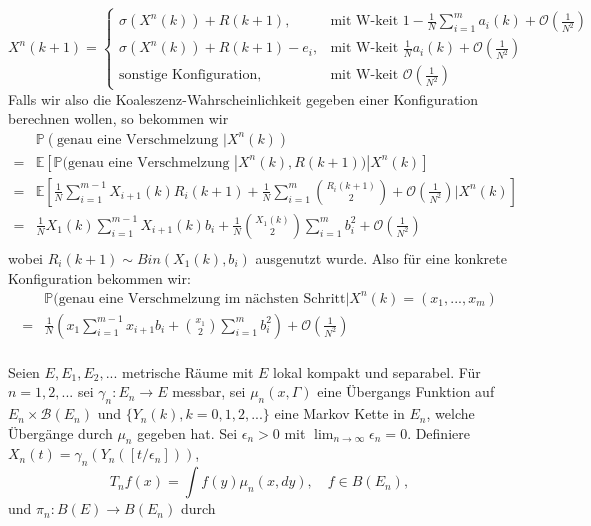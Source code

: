 \begin{equation}
    X^n(k+1) = 
    \begin{cases}
        \sigma(X^n(k)) + R(k+1), &\text{mit W-keit } 1 - \frac{1}{N}\sum_{i=1}^{m} a_i(k) + \mathcal{O}\left(\frac{1}{N^2}\right)\\
        \sigma(X^n(k)) + R(k+1) - e_i, &\text{mit W-keit } \frac{1}{N}a_i(k) + \mathcal{O}\left(\frac{1}{N^2}\right)\\
        \text{sonstige Konfiguration} , &\text{mit W-keit } \mathcal{O} \left(\frac{1}{N^2}\right) 
    \end{cases}
\end{equation}
Falls wir also die Koaleszenz-Wahrscheinlichkeit gegeben einer Konfiguration berechnen wollen, so bekommen wir
\begin{align}
    &\mathbb{P}(\text{genau eine Verschmelzung }| X^n(k))  \\
    = &\mathbb{E}[\mathbb{P}(\text{genau eine Verschmelzung }| X^n(k), R(k+1))|X^n(k)] \\
    = &\mathbb{E}[\frac{1}{N} \sum_{i=1}^{m-1} X_{i+1}(k)R_i(k+1) + \frac{1}{N}\sum_{i=1}^{m}\binom{R_i(k+1)}{2} + \mathcal{O}\left(\frac{1}{N^2}\right)| X^n(k)] \\
    = &\frac{1}{N} X_1(k)\sum_{i=1}^{m-1} X_{i+1}(k)b_i + \frac{1}{N}\binom{X_1(k)}{2}\sum_{i=1}^{m}b_i^2 + \mathcal{O}\left(\frac{1}{N^2}\right) \\
\end{align}
wobei $R_i(k+1) \sim Bin(X_1(k),b_i)$ ausgenutzt wurde.
Also für eine konkrete Konfiguration bekommen wir:
\begin{align}
    &\mathbb{P}(\text{genau eine Verschmelzung im nächsten Schritt}| X^n(k) = (x_1,...,x_m)  \\
    = &\frac{1}{N}\left( x_1\sum_{i=1}^{m-1} x_{i+1}b_i + \binom{x_1}{2}\sum_{i=1}^{m}b_i^2 \right) + \mathcal{O}\left(\frac{1}{N^2}\right) \\
\end{align}





\begin{theorem}
    
    Seien $E,E_1,E_2,...$ metrische Räume mit $E$ lokal kompakt und separabel. Für $n = 1,2,...$ sei $\gamma_n : E_n \to E $ messbar, sei $\mu_n(x,\Gamma)$ eine Übergangs Funktion auf $E_n \times \mathcal{B}(E_n)$ und $\{Y_n(k), k = 0,1,2,...\}$ eine Markov Kette in $E_n$, welche Übergänge durch $\mu_n$ gegeben hat. Sei $\epsilon_n > 0$ mit $\lim_{n \to \infty} \epsilon_n = 0$. Definiere
    $X_n(t) = \gamma_n(Y_n([t/\epsilon_n]))$,
    \[
        T_n f(x) = \int f(y) \mu_n(x,dy), \quad f \in B(E_n),
    \]
    und $\pi_n: B(E) \to B(E_n)$ durch 
    
\end{theorem}

